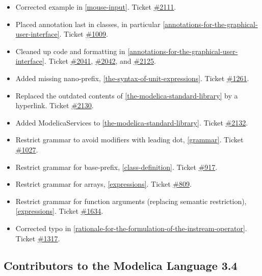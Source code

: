 \documentclass[10pt,a4paper]{report}
\def\doublelabel#1{\label{#1}}
\begin{document}
\begin{itemize}
\item
  Corrected example in \ref{mouse-input}. Ticket
  \href{https://trac.modelica.org/Modelica/ticket/2111}{\#2111}.
\item
  Placed annotation last in classes, in particular \ref{annotations-for-the-graphical-user-interface}. Ticket
  \href{https://trac.modelica.org/Modelica/ticket/1009}{\#1009}.
\item
  Cleaned up code and formatting in \ref{annotations-for-the-graphical-user-interface}. Ticket
  \href{https://trac.modelica.org/Modelica/ticket/2041}{\#2041},
  \href{https://trac.modelica.org/Modelica/ticket/2042}{\#2042}, and
  \href{https://trac.modelica.org/Modelica/ticket/2125}{\#2125}.
\item
  Added missing nano-prefix, \ref{the-syntax-of-unit-expressions}. Ticket
  \href{https://trac.modelica.org/Modelica/ticket/1261}{\#1261}.
\item
  Replaced the outdated contents of \ref{the-modelica-standard-library} by a hyperlink. Ticket
  \href{https://trac.modelica.org/Modelica/ticket/2130}{\#2130}.
\item
  Added ModelicaServices to \ref{the-modelica-standard-library}. Ticket
  \href{https://trac.modelica.org/Modelica/ticket/2132}{\#2132}.
\item
  Restrict grammar to avoid modifiers with leading dot, \ref{grammar}.
  Ticket \href{https://trac.modelica.org/Modelica/ticket/1027}{\#1027}.
\item
  Restrict grammar for base-prefix, \ref{class-definition}. Ticket
  \href{https://trac.modelica.org/Modelica/ticket/917}{\#917}.
\item
  Restrict grammar for arrays, \ref{expressions}. Ticket
  \href{https://trac.modelica.org/Modelica/ticket/809}{\#809}.
\item
  Restrict grammar for function arguments (replacing semantic
  restriction), \ref{expressions}. Ticket
  \href{https://trac.modelica.org/Modelica/ticket/1634}{\#1634}.
\item
  Corrected typo in \ref{rationale-for-the-formulation-of-the-instream-operator}. Ticket
  \href{https://trac.modelica.org/Modelica/ticket/1317}{\#1317}.
\end{itemize}

\subsection{Contributors to the Modelica Language 3.4}\doublelabel{contributors-to-the-modelica-language-3-4}
\end{document}
